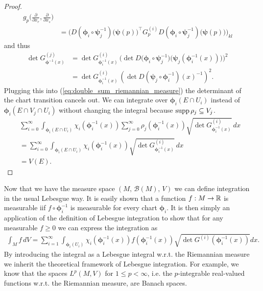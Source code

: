 \documentclass[../master_thesis.tex]{subfiles}
\begin{document}
\begin{proof}
\begin{align*}
            \, g_p\Big(\frac{\partial}{\partial x_r}, \frac{\partial}{\partial x_s}\Big)
        \\ &= \bigg( D(\boldsymbol{\phi}_i 
            \circ \boldsymbol{\psi}_j^{-1})\big(\boldsymbol{\psi}(p)\big)^\top 
            G^{(i)}_p D(\boldsymbol{\phi}_i \circ \boldsymbol{\psi}_j^{-1})\big(\boldsymbol{\psi}(p)\big)\bigg)_{kl}
    \end{align*}
    and thus 
    \begin{align*}
        \det G^{(j)}_{\boldsymbol{\phi}^{-1}(x)} 
        &= \det G^{(i)}_{\boldsymbol{\phi}_i^{-1}(x)} \,
            \bigg(\det D\big(\boldsymbol{\phi}_i 
            \circ \boldsymbol{\psi}_j^{-1}\big)\big(\boldsymbol{\psi}_j(\boldsymbol{\phi}_i^{-1}(x))\big)\bigg)^2
        \\ &= \det G^{(i)}_{\boldsymbol{\phi}_i^{-1}(x)} \,
            \left( \det D(\boldsymbol{\psi}_j \circ \bm{\phi}_i^{-1})(x)^{-1}\right)^2.
    \end{align*}
    Plugging this into (\ref{eq:double_sum_riemannian_measure}) the determinant 
    of the chart transition cancels out. 
    We can integrate over $\boldsymbol{\phi}_i(E \cap U_i)$ 
    instead of $\boldsymbol{\phi}_i(E \cap V_j \cap U_i)$ without changing the integral 
    because $\operatorname{supp} \rho_j \subseteq V_j$.
    \begin{align*}
        &\sum_{i=0}^\infty \int_{\boldsymbol{\phi}_i(E \cap U_i)} \chi_i(\boldsymbol{\phi}_i^{-1}(x))\sum_{j=0}^\infty \rho_j(\boldsymbol{\phi}_i^{-1}(x))
            \sqrt{\det G^{(i)}_{\boldsymbol{\phi}_i^{-1}(x)}} \, dx
        \\ &= \sum_{i=0}^\infty \int_{\boldsymbol{\phi}_i(E \cap U_i)} \chi_i(\boldsymbol{\phi}_i^{-1}(x))
             \sqrt{\det G^{(i)}_{\boldsymbol{\phi}_i^{-1}(x)}} \, dx
        \\ &= V(E).
    \end{align*}
\end{proof}


Now that we have the measure space $(M, \, \mathcal{B}(M), \, V)$
we can define integration in the usual Lebesgue way.
It is easily shown that a function $f: M \rightarrow \mathbb{R}$ is measurable 
iif $f \circ \boldsymbol{\phi}_i^{-1}$ is measurable for every chart $\boldsymbol{\phi}_i$. 
It is then simply an application of the definition of Lebesgue integration to
show that for any measurable $f \geq 0$ we can express the integration as
\begin{align*}
    \int_M f \, dV = \sum\limits_{i=1}^\infty \int_{\boldsymbol{\phi}_i(U_i)} 
        \chi_i(\boldsymbol{\phi}_i^{-1}(x)) f(\boldsymbol{\phi}_i^{-1}(x)) 
        \sqrt{\det G^{(i)}(\boldsymbol{\phi}_i^{-1}(x))} dx.
\end{align*}
By introducing the integral as a Lebesgue integral w.r.t. the Riemannian 
measure we inherit the theoretical framework of Lebesgue integration. 
For example, we know that the spaces $L^p(M,V)$ for $1\leq p < \infty$,
i.e. the $p$-integrable 
real-valued functions w.r.t. the Riemannian measure, are Banach spaces.
\end{document}
